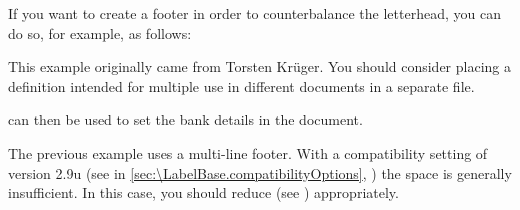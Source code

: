 \begin{Example}
  If you want to create a footer in order to counterbalance the letterhead, you
  can do so, for example, as follows:
\begin{lstcode}
\end{lstcode}
  This example originally came from Torsten Kr\"uger. You should
  consider placing a definition intended for multiple use in different
  documents in a separate  file.
\begin{lstcode}
\end{lstcode}
  can then be used to set the bank details in the document.
\end{Example}

The previous example uses a multi-line footer.  With a compatibility setting
of version 2.9u (see  in
\autoref{sec:\LabelBase.compatibilityOptions},
) the space is generally insufficient.
In this case, you should reduce  (see
) appropriately.%
\EndIndexGroup

